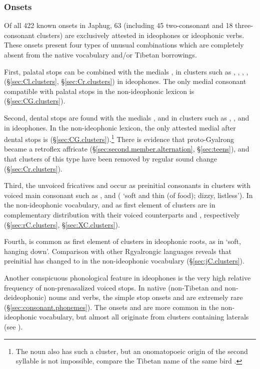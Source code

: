 \subsubsection{Onsets} \label{sec:idph.onsets}
Of all 422 known onsets in Japhug, 63 (including 45 two-consonant and 18 three-consonant clusters) are exclusively attested in ideophones or ideophonic verbs. These onsets present four types of unusual combinations  which are completely absent from the native vocabulary and/or Tibetan borrowings.

First, palatal stops can be combined with the medials ,  in clusters such as , , , ,  (§\ref{sec:Cl.clusters}, §\ref{sec:Cr.clusters}) in ideophones. The only medial consonant compatible with palatal stops in the non-ideophonic lexicon is  (§\ref{sec:CG.clusters}).

Second, dental stops are found with the medials ,  and  in clusters such as , ,   and  in ideophones. In the non-ideophonic lexicon, the only attested medial after dental stops is  (§\ref{sec:CG.clusters}).\footnote{The noun  also has such a cluster, but an onomatopoeic origin of the second syllable is not impossible, compare the Tibetan name of the same bird . } There is evidence that proto-Gyalrong  became a retroflex affricate  (§\ref{sec:second.member.alternation}, §\ref{sec:teens}), and that clusters of this type have been removed by regular sound change (§\ref{sec:Cr.clusters}).

Third, the unvoiced fricatives  and  occur as preinitial consonants in clusters with voiced main consonant such as ,  and  ( `soft and thin (of food); dizzy, listless'). In the non-ideophonic vocabulary,  and  as first element of clusters are in complementary distribution with their voiced counterparts  and , respectively (§\ref{sec:rC.clusters}, §\ref{sec:XC.clusters}).

Fourth,  is common as first element of clusters in ideophonic roots, as in   `soft, hanging down'. Comparison with other Rgyalrongic languages reveals that  preinitial has changed to  in the non-ideophonic vocabulary (§\ref{sec:jC.clusters}). 

Another conspicuous phonological feature in ideophones is the very high relative frequency of non-prenasalized voiced stops. In native (non-Tibetan and non-deideophonic) nouns and verbs, the simple stop onsets  and  are extremely rare (§\ref{sec:consonant.phonemes}). The onsets  and  are more common in the non-ideophonic vocabulary, but almost all originate from clusters containing laterals (see \citealt[313--314]{jacques04these}).


